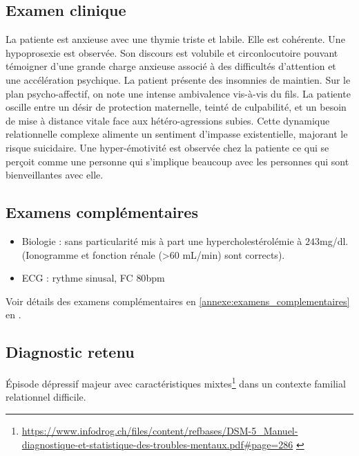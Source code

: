 \subsection{Examen clinique}
La patiente est anxieuse avec une thymie triste et labile.
Elle est cohérente. Une hypoprosexie est observée. 
Son discours est volubile et circonlocutoire pouvant témoigner d’une grande charge anxieuse associé à des difficultés d’attention et une accélération psychique. 
La patient présente des insomnies de maintien. 
Sur le plan psycho-affectif, on note une intense ambivalence vis-à-vis du fils. 
La patiente oscille entre un désir de protection maternelle, teinté de culpabilité, et un besoin de mise à distance vitale face aux hétéro-agressions subies. Cette dynamique relationnelle complexe alimente un sentiment d'impasse existentielle, majorant le risque suicidaire. 
Une hyper-émotivité est observée chez la patiente ce qui se perçoit comme une personne qui s’implique beaucoup avec les personnes qui sont bienveillantes avec elle. 

\subsection{Examens complémentaires}
\begin{itemize}[label=\textbullet]
    \item Biologie : sans particularité mis à part une hypercholestérolémie à $243$mg/dl. (Ionogramme et fonction rénale (>$60$ mL/min) sont corrects).
    \item ECG : rythme sinusal, FC $80$bpm
\end{itemize}
Voir détails des examens complémentaires en \cref{annexe:examens_complementaires} en .

\subsection{Diagnostic retenu}
 
Épisode dépressif majeur avec caractéristiques mixtes\footnote{\url{https://www.infodrog.ch/files/content/refbases/DSM-5_Manuel-diagnostique-et-statistique-des-troubles-mentaux.pdf\#page=286} \parencite{dsm5_online}}  dans un contexte familial relationnel difficile.

